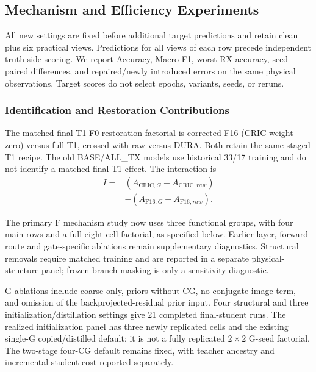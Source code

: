 

\subsection{Mechanism and Efficiency Experiments}
\label{sec:cric-ablation}
All new settings are fixed before additional target predictions and retain clean plus six practical views. Predictions for all views of each row precede independent truth-side scoring. We report Accuracy, Macro-F1, worst-RX accuracy, seed-paired differences, and repaired/newly introduced errors on the same physical observations. Target scores do not select epochs, variants, seeds, or reruns.

\subsubsection{Identification and Restoration Contributions}
The matched final-T1 F0 restoration factorial is corrected F16 (CRIC weight zero) versus full T1, crossed with raw versus DURA. Both retain the same staged T1 recipe. The old BASE/ALL\_TX models use historical 33/17 training and do not identify a matched final-T1 effect. The interaction is
\begin{equation}
\begin{split}
I={}&(A_{\mathrm{CRIC},G}-A_{\mathrm{CRIC},raw})\\
&-(A_{\mathrm{F16},G}-A_{\mathrm{F16},raw}).
\end{split}
\end{equation}


The primary F mechanism study now uses three functional groups, with four main rows and a full eight-cell factorial, as specified below. Earlier layer, forward-route and gate-specific ablations remain supplementary diagnostics. Structural removals require matched training and are reported in a separate physical-structure panel; frozen branch masking is only a sensitivity diagnostic.

G ablations include coarse-only, priors without CG, no conjugate-image term, and omission of the backprojected-residual prior input. Four structural and three initialization/distillation settings give 21 completed final-student runs. The realized initialization panel has three newly replicated cells and the existing single-G copied/distilled default; it is not a fully replicated $2\times2$ G-seed factorial. The two-stage four-CG default remains fixed, with teacher ancestry and incremental student cost reported separately.

